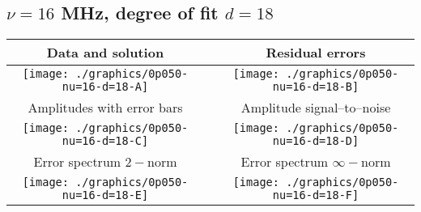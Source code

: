 

% 

\clearpage{}
\break{}

\subsection{$\nu = 16$ MHz, degree of fit $d = 18$}

\begin{table}[h]
    \begin{center}
        \begin{tabular}{ccc}
            Data and solution & \quad & Residual errors \\\hline
            \texttt{[image: ./graphics/0p050-nu=16-d=18-A]} &&
            \texttt{[image: ./graphics/0p050-nu=16-d=18-B]} \\[15pt]
            Amplitudes with error bars && Amplitude signal--to--noise \\\hline
            \texttt{[image: ./graphics/0p050-nu=16-d=18-C]} &&
            \texttt{[image: ./graphics/0p050-nu=16-d=18-D]} \\[15pt]
            Error spectrum $2-$norm && Error spectrum $\infty-$norm \\\hline
            \texttt{[image: ./graphics/0p050-nu=16-d=18-E]} &&
            \texttt{[image: ./graphics/0p050-nu=16-d=18-F]} \\[15pt]
        \end{tabular}
    \end{center}
\label{fig:elev=50, nu=16}
\end{table}



\endinput
